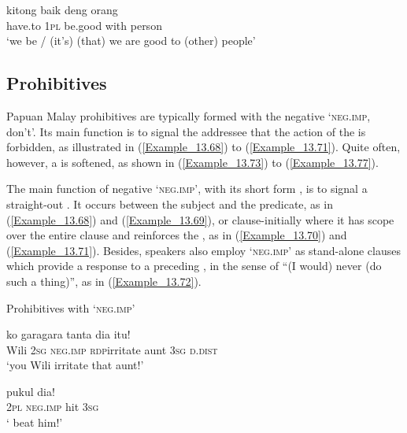 \ea
\label{Example_13.67}
 {kitong} {baik} {deng} {orang}\\ %
 have.to  \textsc{1pl}  be.good  with  person\\
\glt
‘we \bluebold{)} be / (it’s)  (that) we are good to (other) people’ \textstyleExampleSource{[081110-008-CvNP.0166]}
\z

\newpage 
\subsection{Prohibitives}
\label{Para_13.3.3}
Papuan Malay prohibitives are typically formed with the negative   ‘\textsc{neg.imp}, don’t’. Its main function is to signal the addressee that the action of the  is forbidden, as illustrated in (\ref{Example_13.68}) to (\ref{Example_13.71}). Quite often, however, a  is softened, as shown in (\ref{Example_13.73}) to (\ref{Example_13.77}).



The main function of negative   ‘\textsc{neg.imp}’, with its short form , is to signal a straight-out . It occurs between the subject and the predicate, as in (\ref{Example_13.68}) and (\ref{Example_13.69}), or clause-initially where it has scope over the entire clause and reinforces the , as in (\ref{Example_13.70}) and (\ref{Example_13.71}). Besides, speakers also employ  ‘\textsc{neg.imp}’ as stand-alone clauses which provide a response to a preceding , in the sense of ``(I would) never (do such a thing)'', as in (\ref{Example_13.72}).


\begin{styleExampleTitle}
Prohibitives with  ‘\textsc{neg.imp}’
\end{styleExampleTitle}

\ea
\label{Example_13.68}
 {ko} {} {gara{\Tilde}gara} {tanta} {dia} {itu!}\\ %
 Wili  \textsc{2sg}  \textsc{neg.imp}  \textsc{rdp}{\Tilde}irritate  aunt  \textsc{3sg}  \textsc{d.dist}\\
 ‘you Wili  irritate that aunt!’ \textstyleExampleSource{[081023-001-Cv.0038]}
\z

\ea
\label{Example_13.69}
 {} {pukul} {dia!}\\ %
 \textsc{2pl}  \textsc{neg.imp}  hit  \textsc{3sg}\\
\glt 
‘ beat him!’ \textstyleExampleSource{[081015-005-NP.0024]}
\z

